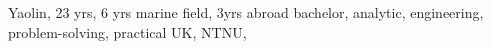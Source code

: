 \documentclass{article}
\begin{document}
Yaolin, 23 yrs, 6 yrs marine field, 3yrs abroad
bachelor, analytic, engineering, problem-solving, practical
UK, 
NTNU,  
\end{document}
